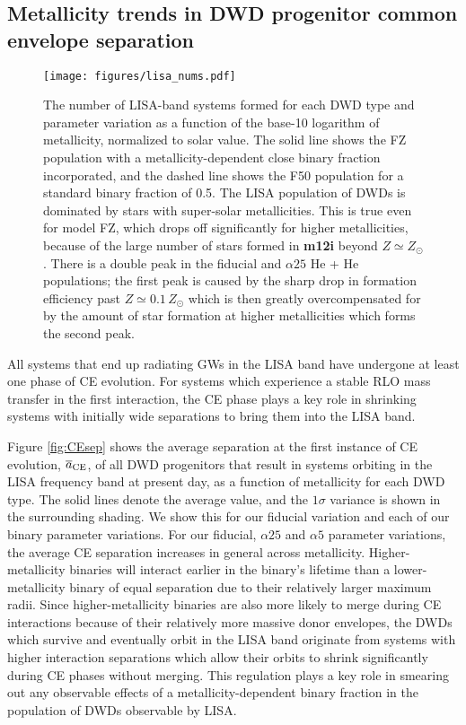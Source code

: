 \documentclass[twocolumn, linenumbers]{aastex631}
\begin{document}
\subsection{Metallicity trends in DWD progenitor common envelope separation}\label{sec:CEsep}

\begin{figure*}
	\texttt{[image: figures/lisa\_nums.pdf]}
    \caption{The number of LISA-band systems formed for each DWD type and parameter variation as a function of the base-10 logarithm of metallicity, normalized to solar value. The solid line shows the FZ population with a metallicity-dependent close binary fraction incorporated, and the dashed line shows the F50 population for a standard binary fraction of 0.5. The LISA population of DWDs is dominated by stars with super-solar metallicities. This is true even for model FZ, which drops off significantly for higher metallicities, because of the large number of stars formed in \textbf{m12i} beyond $Z\simeq Z_\odot$. There is a double peak in the fiducial and $\alpha25$ He + He populations; the first peak is caused by the sharp drop in formation efficiency past $Z\simeq0.1\,Z_\odot$ which is then greatly overcompensated for by the amount of star formation at higher metallicities which forms the second peak.}
    \label{fig:lisa_nums}
\end{figure*}

All systems that end up radiating GWs in the LISA band have undergone at least one phase of CE evolution. For systems which experience a stable RLO mass transfer in the first interaction, the CE phase plays a key role in shrinking systems with initially wide separations to bring them into the LISA band. 

Figure \ref{fig:CEsep} shows the average separation at the first instance of CE evolution, $\overline{a}_{\rm{CE}}$, of all DWD progenitors that result in systems orbiting in the LISA frequency band at present day, as a function of metallicity for each DWD type. The solid lines denote the average value, and the $1\sigma$ variance is shown in the surrounding shading. We show this for our fiducial variation and each of our binary parameter variations. For our fiducial, $\alpha25$ and $\alpha5$ parameter variations, the average CE separation increases in general across metallicity. Higher-metallicity binaries will interact earlier in the binary's lifetime than a lower-metallicity binary of equal separation due to their relatively larger maximum radii. Since higher-metallicity binaries are also more likely to merge during CE interactions because of their relatively more massive donor envelopes, the DWDs which survive and eventually orbit in the LISA band originate from systems with higher interaction separations which allow their orbits to shrink significantly during CE phases without merging. This regulation plays a key role in smearing out any observable effects of a metallicity-dependent binary fraction in the population of DWDs observable by LISA. 
\end{document}
